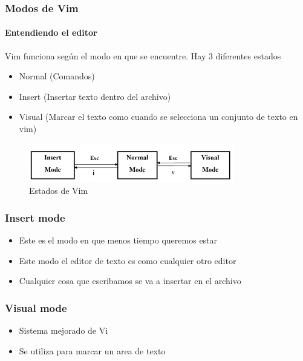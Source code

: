 \documentclass{beamer}
\begin{document}
  \begin{frame}[t]
    \frametitle{Modos de Vim}
    \framesubtitle{Entendiendo el editor}
    Vim funciona según el modo en que se encuentre.
    Hay 3 diferentes estados
    \begin{itemize}
      \item Normal (Comandos)
      \item Insert (Insertar texto dentro del archivo)
      \item Visual (Marcar el texto como cuando se selecciona un conjunto de texto en vim)
    \end{itemize}
    \begin{figure}[h]
      \centering
      \includegraphics[width=0.8\textwidth]{./resources/10.png}
      \caption{Estados de Vim}
      \label{fig:10}
    \end{figure}
  \end{frame}
  \begin{frame}[t]
    \frametitle{Insert mode}
    \begin{itemize}
      \item Este es el modo en que menos tiempo queremos estar
      \item Este modo el editor de texto es como cualquier otro editor
      \item Cualquier cosa que escribamos se va a insertar en el archivo 
    \end{itemize}
  \end{frame}
  \begin{frame}[t]
    \frametitle{Visual mode}
    \begin{itemize}
      \item Sistema mejorado de Vi
      \item Se utiliza para marcar un area de texto
    \end{itemize}
    
  \end{frame}
\end{document}
